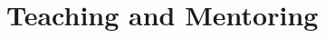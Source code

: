 \documentclass[a4paper]{moderncv}
\begin{document}
\section{Teaching and Mentoring}
%
%
\end{document}
